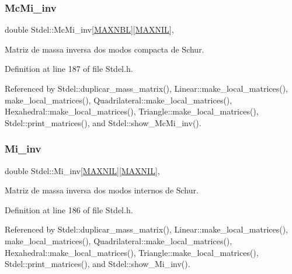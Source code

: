 \subsubsection{\texorpdfstring{Mc\+Mi\+\_\+inv}{McMi\_inv}}
{\footnotesize\ttfamily double Stdel\+::\+Mc\+Mi\+\_\+inv\mbox{[}\hyperlink{MyOptions_8h_aed8828a63ec0a2a0461b7c9ed39dd648}{M\+A\+X\+N\+BL}\mbox{]}\mbox{[}\hyperlink{MyOptions_8h_a463cdf068fb6289d1f81dac7e0f76ab5}{M\+A\+X\+N\+IL}\mbox{]}\hspace{0.3cm}{\ttfamily [protected]}, {\ttfamily [inherited]}}



Matriz de massa inversa dos modos compacta de Schur. 



Definition at line 187 of file Stdel.\+h.



Referenced by Stdel\+::duplicar\+\_\+mass\+\_\+matrix(), Linear\+::make\+\_\+local\+\_\+matrices(), make\+\_\+local\+\_\+matrices(), Quadrilateral\+::make\+\_\+local\+\_\+matrices(), Hexahedral\+::make\+\_\+local\+\_\+matrices(), Triangle\+::make\+\_\+local\+\_\+matrices(), Stdel\+::print\+\_\+matrices(), and Stdel\+::show\+\_\+\+Mc\+Mi\+\_\+inv().

\mbox{\label{classStdel_a53a9490d5a02a96473d96848bac3711a}} 
\subsubsection{\texorpdfstring{Mi\+\_\+inv}{Mi\_inv}}
{\footnotesize\ttfamily double Stdel\+::\+Mi\+\_\+inv\mbox{[}\hyperlink{MyOptions_8h_a463cdf068fb6289d1f81dac7e0f76ab5}{M\+A\+X\+N\+IL}\mbox{]}\mbox{[}\hyperlink{MyOptions_8h_a463cdf068fb6289d1f81dac7e0f76ab5}{M\+A\+X\+N\+IL}\mbox{]}\hspace{0.3cm}{\ttfamily [protected]}, {\ttfamily [inherited]}}



Matriz de massa inversa dos modos internos de Schur. 



Definition at line 186 of file Stdel.\+h.



Referenced by Stdel\+::duplicar\+\_\+mass\+\_\+matrix(), Linear\+::make\+\_\+local\+\_\+matrices(), make\+\_\+local\+\_\+matrices(), Quadrilateral\+::make\+\_\+local\+\_\+matrices(), Hexahedral\+::make\+\_\+local\+\_\+matrices(), Triangle\+::make\+\_\+local\+\_\+matrices(), Stdel\+::print\+\_\+matrices(), and Stdel\+::show\+\_\+\+Mi\+\_\+inv().

